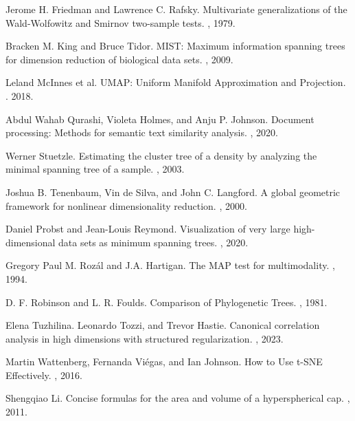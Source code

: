 \documentclass{article}
\begin{document}
\begin{thebibliography}{10}
Jerome H. Friedman and Lawrence C. Rafsky.
\newblock Multivariate generalizations of the Wald-Wolfowitz and Smirnov two-sample tests.
, 1979.

Bracken M. King and Bruce Tidor.
\newblock MIST: Maximum information spanning trees for dimension reduction of biological data sets.
, 2009.

Leland McInnes et al.
\newblock UMAP: Uniform Manifold Approximation and Projection.
. 2018.

Abdul Wahab Qurashi, Violeta Holmes, and Anju P. Johnson.
\newblock Document processing: Methods for semantic text similarity analysis.
, 2020.

Werner Stuetzle.
\newblock Estimating the cluster tree of a density by analyzing the minimal spanning tree of a sample.
, 2003.

Joshua B. Tenenbaum, Vin de Silva, and John C. Langford.
\newblock A global geometric framework for nonlinear dimensionality reduction.
, 2000.

Daniel Probst and Jean-Louis Reymond.
\newblock Visualization of very large high-dimensional data sets as minimum spanning trees.
, 2020.

Gregory Paul M. Roz\'al and J.A. Hartigan.
\newblock The MAP test for multimodality.
, 1994.

D. F. Robinson and L. R. Foulds.
\newblock Comparison of Phylogenetic Trees.
, 1981.

Elena Tuzhilina. Leonardo Tozzi, and Trevor Hastie.
\newblock Canonical correlation analysis in high dimensions with structured regularization.
, 2023.

Martin Wattenberg, Fernanda Vi\'egas, and Ian Johnson.
\newblock How to Use t-SNE Effectively.
, 2016.

Shengqiao Li.
\newblock Concise formulas for the area and volume of a hyperspherical cap.
, 2011.

\end{thebibliography}
\end{document}
